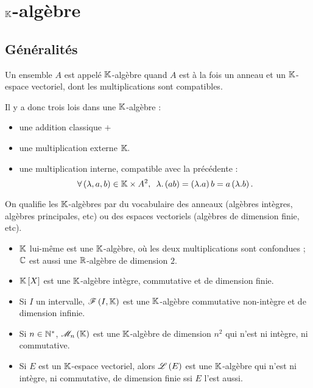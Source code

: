 \section{\(\mathbb{K}\)-algèbre}

\subsection{Généralités}

\begin{defi}
Un ensemble \(A\) est appelé \(\mathbb{K}\)-algèbre quand \(A\) est à la fois un anneau et un \(\mathbb{K}\)-espace vectoriel, dont les multiplications sont compatibles.

Il y a donc trois lois dans une \(\mathbb{K}\)-algèbre :

\begin{itemize}
    \item une addition classique \(+\) \\
    \item une multiplication externe \(\mathbb{K}.\) \\
    \item une multiplication interne, compatible avec la précédente : \[\quantifs{\forall\paren{\lambda,a,b}\in\K\times A^2}\lambda.\paren{ab}=\paren{\lambda.a}b=a\paren{\lambda.b}.\]
\end{itemize}
\end{defi}

On qualifie les \(\mathbb{K}\)-algèbres par du vocabulaire des anneaux (algèbres intègres, algèbres principales, etc) ou des espaces vectoriels (algèbres de dimension finie, etc).

\begin{ex}
\begin{itemize}
    \item \(\mathbb{K}\) lui-même est une \(\mathbb{K}\)-algèbre, où les deux multiplications sont confondues ; \(\mathbb{C}\) est aussi une \(\mathbb{R}\)-algèbre de dimension \(2\). \\
    \item \(\poly\) est une \(\mathbb{K}\)-algèbre intègre, commutative et de dimension finie. \\
    \item Si \(I\) un intervalle, \(\mathscr{F}\left(I,\mathbb{K}\right)\) est une \(\mathbb{K}\)-algèbre commutative non-intègre et de dimension infinie. \\
    \item Si \(n\in\mathbb{N}^*\), \(\M{n}\) est une \(\mathbb{K}\)-algèbre de dimension \(n^2\) qui n'est ni intègre, ni commutative. \\
    \item Si \(E\) est un \(\mathbb{K}\)-espace vectoriel, alors \(\mathscr{L}\left(E\right)\) est une \(\mathbb{K}\)-algèbre qui n'est ni intègre, ni commutative, de dimension finie ssi \(E\) l'est aussi.
\end{itemize}
\end{ex}

